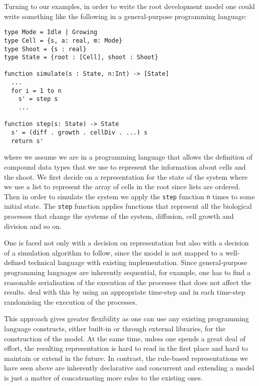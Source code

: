 Turning to our examples, in order to write the root development model one could
write something like the following in a general-purpose programming language:

\begin{BVerbatim}
type Mode = Idle | Growing
type Cell = {s, a: real, m: Mode}
type Shoot = {s : real}
type State = {root : [Cell], shoot : Shoot}

function simulate(s : State, n:Int) -> [State]
  ...
  for i = 1 to n
    s' = step s
    ...

function step(s: State) -> State
  s' = (diff . growth . cellDiv . ...) s
  return s'
\end{BVerbatim}

where we assume we are in a programming language that allows the definition of
compound data types that we use to represent the information about cells and the
shoot. We first decide on a representation for the state of the system where we
use a list to represent the array of cells in the root since lists are
ordered. Then in order to simulate the system we apply the \texttt{step}
function \texttt{n} times to some initial state. The \texttt{step} function
applies functions that represent all the biological processes that change the
systems of the system, diffusion, cell growth and division and so on.

One is faced not only with a decision on representation but also with a decision
of a simulation algorithm to follow, since the model is not mapped to a
well-defined technical language with existing implementation. Since
general-purpose programming languages are inherently sequential, for example,
one has to find a reasonable serialisation of the execution of the processes
that does not affect the results. \citet{karr_whole-cell_2012} deal with this by
using an appropriate time-step and in each time-step randomising the execution
of the processes.

This approach gives greater flexibility as one can use any existing programming
language constructs, either built-in or through external libraries, for the
construction of the model. At the same time, unless one spends a great deal of
effort, the resulting representation is hard to read in the first place and hard
to maintain or extend in the future. In contrast, the rule-based representations
we have seen above are inherently declarative and concurrent and extending a
model is just a matter of concatenating more rules to the existing ones.

